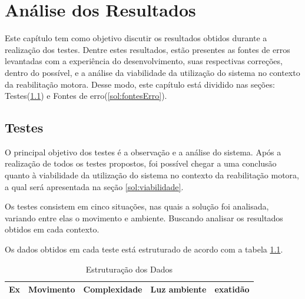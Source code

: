 \chapter[Análise dos Resultados]{Análise dos Resultados}\label{ch:analiseResultados}
  Este capítulo tem como objetivo discutir  os resultados obtidos durante a realização dos testes. Dentre estes
resultados, estão presentes as fontes de erros levantadas com a experiência do desenvolvimento,
suas respectivas correções, dentro do possível, e a análise da viabilidade da utilização do
sistema no contexto da reabilitação motora. Desse modo, este
capítulo está dividido nas seções: Testes(\ref{sec:testes}) e Fontes de erro(\ref{sol:fontesErro}).

\section{Testes}\label{sec:testes}
  O principal objetivo dos testes é a observação e a análise do sistema. Após a realização de todos os testes propostos, foi possível chegar a
uma conclusão quanto à viabilidade da utilização do sistema no contexto da reabilitação motora,
 a qual será apresentada na seção \ref{sol:viabilidade}.

 Os testes consistem em cinco situações, nas quais a solução foi analisada,
variando entre elas o movimento e ambiente. Buscando analisar os resultados obtidos em cada contexto.

  Os dados obtidos em cada teste está estruturado de acordo com a tabela \ref{tab:analise}.

  \begin{table}[H]
  \centering
  \caption{Estruturação dos Dados}
  \label{tab:analise}
  \begin{tabular}{@{}|l|l|l|l|l|@{}}
  \toprule
  \textbf{Ex} &\textbf{Movimento} & \textbf{Complexidade} & \textbf{Luz ambiente} & \textbf{exatidão} \\ \bottomrule
  \end{tabular}
  \end{table}

